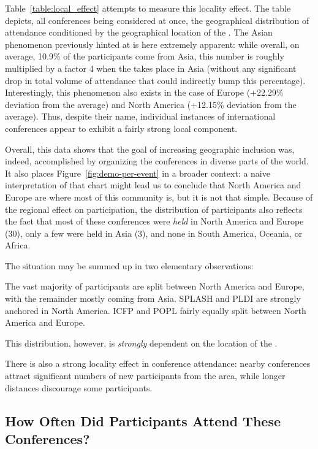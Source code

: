 Table~\ref{table:local_effect} attempts to measure this locality effect. The
table depicts, all conferences being considered at once, the geographical
distribution of attendance conditioned by the geographical location of the
\event. The Asian phenomenon previously hinted at is here extremely
apparent: while overall, on average, 10.9\% of the participants come from Asia,
this number is roughly multiplied by a factor 4 when the \event takes place
in Asia (without any significant drop in total volume of attendance that
could indirectly bump this percentage).
Interestingly, this phenomenon also exists in the case of Europe (+22.29\%
deviation from the average) and North America (+12.15\% deviation from the
average).
Thus, despite their name, individual instances of international conferences
appear to exhibit a fairly strong local component.

Overall, this data shows that the goal of increasing geographic inclusion was,
indeed, accomplished by organizing the conferences in diverse parts
of the world. It also places Figure~\ref{fig:demo-per-event} in a broader
context:
a naive interpretation of that chart might lead us to conclude that North
America and Europe are where most of this community is, but it is not that
simple. Because of the regional effect on participation, the distribution of
participants also reflects the fact that most of these conferences were {\em
  held} in
North America and Europe (30), only a few were held in Asia (3), and none in
South America, Oceania, or Africa.

The situation may be summed up in two elementary observations:
\begin{obs}
  The vast majority of participants are split between North America and
  Europe, with the remainder mostly coming from
  Asia. SPLASH and PLDI are strongly anchored in North
  America. ICFP and POPL fairly equally split between North America and Europe.
  \label{obs:dist-naive}
\end{obs}
This distribution, however, is \emph{strongly} dependent on the
location of the \event.
\begin{obs}
  There is also a strong locality effect in conference attendance: nearby
  conferences attract significant numbers of new participants from the area,
  while longer distances discourage some participants.
  \label{obs:locality}
\end{obs}

\subsection{How Often Did Participants Attend These Conferences?}
\label{subsec:overlap}

